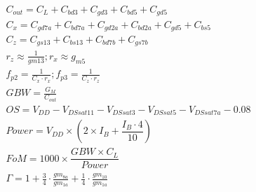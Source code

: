 \begin{gather*}
C_{out} = C_L + C_{bd3} + C_{gd3} + C_{bd5} + C_{gd5} \\
C_x = C_{gd7a} + C_{bd7a}+ C_{gd2a} + C_{bd2a} + C_{gd5} + C_{bs5}\\
C_z = C_{gs13} + C_{bs13} + C_{bd7b}+ C_{gs7b} \\
r_z \approx \frac{1}{gm13} ; r_x \approx g_{m5} \\
f_{p2} = \frac{1}{C_x\cdot r_x};  f_{p3} = \frac{1}{C_z\cdot r_z}\\
GBW = \frac{G_M}{C_{out}} \\[0.125cm]
OS = V_{DD} - V_{DSsat11} - V_{DSsat3} - V_{DSsat5} - V_{DSsat7a}- 0.08 \\[0.125cm]
\textit{Power} = V_{DD} \times \left(2 \times I_B + \dfrac{I_B\cdot 4}{10}\right) \\[0.125cm]
FoM = 1000 \times \dfrac{GBW \times C_L}{\textit{Power}}\\
\Gamma = 1 + \frac{3}{4}\cdot \frac{gm_{8a}}{gm_{1a}} + \frac{1}{4}\cdot \frac{gm_{10}}{gm_{1a}}
\end{gather*}
